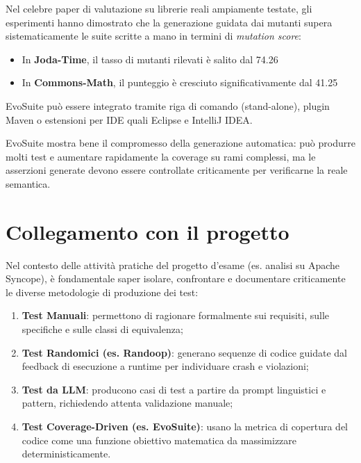 Nel celebre paper di valutazione su librerie reali ampiamente testate, gli esperimenti hanno dimostrato che la generazione guidata dai mutanti supera sistematicamente le suite scritte a mano in termini di \emph{mutation score}:

\begin{itemize}

\item In \textbf{Joda-Time}, il tasso di mutanti rilevati è salito dal 74.26%

\item In \textbf{Commons-Math}, il punteggio è cresciuto significativamente dal 41.25%

\end{itemize}

EvoSuite può essere integrato tramite riga di comando (stand-alone), plugin Maven o estensioni per IDE quali Eclipse e IntelliJ IDEA.

\begin{notaesame}

EvoSuite mostra bene il compromesso della generazione automatica: può produrre molti test e aumentare rapidamente la coverage su rami complessi, ma le asserzioni generate devono essere controllate criticamente per verificarne la reale semantica.

\end{notaesame}

\section{Collegamento con il progetto}

Nel contesto delle attività pratiche del progetto d'esame (es. analisi su Apache Syncope), è fondamentale saper isolare, confrontare e documentare criticamente le diverse metodologie di produzione dei test:

\begin{enumerate}

\item \textbf{Test Manuali}: permettono di ragionare formalmente sui requisiti, sulle specifiche e sulle classi di equivalenza;

\item \textbf{Test Randomici (es. Randoop)}: generano sequenze di codice guidate dal feedback di esecuzione a runtime per individuare crash e violazioni;

\item \textbf{Test da LLM}: producono casi di test a partire da prompt linguistici e pattern, richiedendo attenta validazione manuale;

\item \textbf{Test Coverage-Driven (es. EvoSuite)}: usano la metrica di copertura del codice come una funzione obiettivo matematica da massimizzare deterministicamente.

\end{enumerate}

